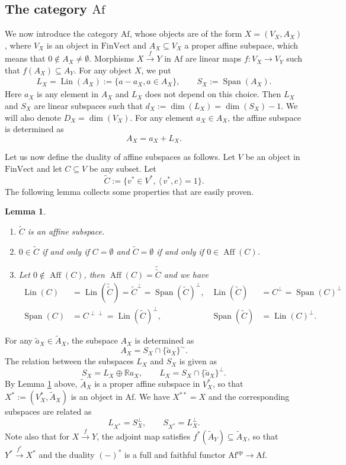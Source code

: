 \documentclass[12pt]{article}
\newtheorem{lemma}{Lemma}
\theoremstyle{definition}
\theoremstyle{remark}
\def\aff{\operatorname{Aff}}
\def\lin{\operatorname{Lin}}
\def\Span{\operatorname{Span}}
\def\<{\langle\,}
\def\>{\,\rangle}
\def \Af{\mathrm{Af}}
\def \FV{\mathrm{FinVect}}
\begin{document}
\subsection{The category $\Af$}

We now introduce the category $\Af$, whose objects  are of the form $X=(V_X,A_X)$, where
$V_X$ is an object in $\FV$  and $A_X\subseteq V_X$ a proper affine subspace, which means
that $0\notin A_X\ne \emptyset$. Morphisms $X\xrightarrow{f} Y$ in $\Af$ are linear maps $f:V_X\to V_Y$  such that
$f(A_X)\subseteq A_Y$. For any object $X$, we put
\begin{align*}
L_X=\lin(A_X):=\{a-a_X, a\in A_X\}, \qquad S_X:=\Span(A_X).
\end{align*}
Here $a_X$ is any element in $A_X$ and $L_X$ does not depend on this choice.
Then $L_X$ and $S_X$ are linear subspaces such that $d_X:=\dim(L_X)=\dim(S_X)-1$. We will
also denote $D_X=\dim(V_X)$. For
any element $a_X\in A_X$, the affine subspace is determined as
\[
A_X=a_X+L_X.
\]

Let us now define the duality of affine subspaces as follows. Let $V$ be an object in
$\FV$ and let $C\subseteq  V$ be any subset. Let
\[
\tilde C:=\{v^*\in V^*, \ \<v^*,c\>=1\}.
\]
The following lemma collects some properties that are easily proven.

\begin{lemma}\label{lemma:dual}
\begin{enumerate}
\item[(i)] $\tilde C$ is an affine subspace.
\item[(ii)] $0\in \tilde C$ if and only if $C= \emptyset$ and   $\tilde C=\emptyset$ if and only if $0\in \aff(C)$.
\item[(iii)] Let  $0\notin \aff(C)$, then $\aff(C)=\tilde{\tilde C}$ and we have
\begin{align*}
\lin(C)&=\lin(\tilde{\tilde C})=\tilde
C^\perp=\Span(\tilde C)^\perp,&  \lin(\tilde C)&=C^\perp=\Span(C)^\perp \\
\Span(C)&=C^{\perp\perp} =\lin(\tilde C)^\perp,&  \Span(\tilde C)&=\lin(C)^\perp.
\end{align*}

\end{enumerate}


\end{lemma}



For any  $\tilde a_X\in \tilde A_X$, the subspace $A_X$ is determined as
\[
A_X=S_X\cap\{\tilde a_X\}^\sim.
\]
The relation between the subspaces $L_X$ and $S_X$ is given as
\[
S_X=L_X\oplus \mathbb R a_X,\qquad L_X=S_X\cap \{\tilde a_X\}^\perp.
\]
By Lemma \ref{lemma:dual} above,  $\tilde A_X$ is a proper affine subspace in $V_X^*$, so that
$X^*:=(V_X^*,\tilde A_X)$ is an object in $\Af$. We have $X^{**}=X$ and the corresponding subspaces
are related as
\begin{equation}\label{eq:duality}
L_{X^*}=S_X^\perp,\qquad S_{X^*}=L_X^\perp.
\end{equation}
Note also that for $X\xrightarrow{f} Y$, the adjoint map satisfies $f^*(\tilde
A_Y)\subseteq \tilde A_X$, so that $Y^*\xrightarrow{f^*} X^*$ and the duality $(-)^*$ is a
full and faithful functor 
$\Af^{op}\to \Af$.
\end{document}
